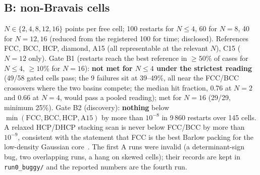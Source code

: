 \documentclass[11pt,a4paper]{article}
\begin{document}
\subsection{B: non-Bravais cells}
$N\in\{2,4,8,12,16\}$ points per free cell; 100 restarts for $N\le4$, 60 for $N=8$, 40 for $N=12,16$ (reduced from the registered
100 for time; disclosed). References FCC, BCC, HCP, diamond, A15 (all representable at the relevant $N$), C15 ($N=12$ only).
Gate B1 (restarts reach the best reference in $\ge50\%$ of cases for $N\le4$, $\ge10\%$ for $N=16$): \textbf{not met for
$N\le4$ under the strictest reading} (49/58 gated cells pass; the 9 failures sit at 39--49\%, all near the FCC/BCC crossovers
where the two basins compete; the median hit fraction, 0.76 at $N=2$ and 0.66 at $N=4$, would pass a pooled reading); met for
$N=16$ (29/29, minimum 25\%). Gate B2 (discovery): \textbf{nothing} below $\min(\mathrm{FCC},\mathrm{BCC},\mathrm{HCP},\mathrm{A15})$
by more than $10^{-8}$ in 9\,860 restarts over 145 cells. A relaxed HCP/DHCP stacking scan is never below FCC/BCC by more than
$10^{-9}$, consistent with the statement that FCC is the best Barlow packing for the low-density Gaussian core~\cite{CK08}.
The first A runs were invalid (a determinant-sign bug, two overlapping runs, a hang on skewed cells); their records are kept in
\texttt{run0\_buggy/} and the reported numbers are the fourth run.
\end{document}
